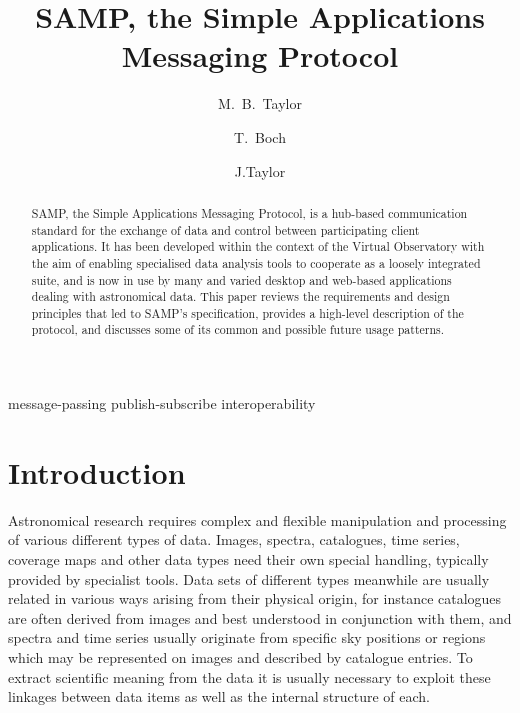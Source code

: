 \documentclass[5p]{elsarticle}
\begin{document}
\begin{frontmatter}

\title{SAMP, the Simple Applications Messaging Protocol}

\author[bristol]{M.~B.~Taylor}
\author[cds]{T.~Boch}
\author[google]{J.Taylor}

\address[bristol]{H.~H.~Wills Physics Laboratory, University of Bristol, UK}
\address[cds]{CDS, Observatoire Astronomique de Strasbourg, France}
\address[google]{Google, USA}

\begin{abstract}
SAMP, the Simple Applications Messaging Protocol, is a
hub-based communication standard for the exchange of data and control
between participating client applications.
It has been developed within the context of the Virtual Observatory
with the aim of enabling specialised data analysis tools to cooperate
as a loosely integrated suite, and is now in use by many and varied
desktop and web-based applications dealing with astronomical data.
This paper reviews the requirements and design principles that led to
SAMP's specification, provides a high-level description of the protocol,
and discusses some of its common and possible future usage patterns.
\end{abstract}

\begin{keyword}
message-passing
publish-subscribe
interoperability
\end{keyword}

\end{frontmatter}

\begin{flushright}
{\tt }
\end{flushright}

\section{Introduction}


Astronomical research requires complex and flexible manipulation
and processing of various different types of data.
Images, spectra, catalogues, time series, coverage maps and other data
types need their own special handling,
typically provided by specialist tools.
Data sets of different types meanwhile are usually related
in various ways arising from their physical origin,
for instance
catalogues are often derived from images and best understood in
conjunction with them, and
spectra and time series usually originate from specific sky positions
or regions which may be represented on images and described by
catalogue entries.
To extract scientific meaning from the data it is usually necessary
to exploit these linkages between data items as well as the
internal structure of each.
\end{document}
